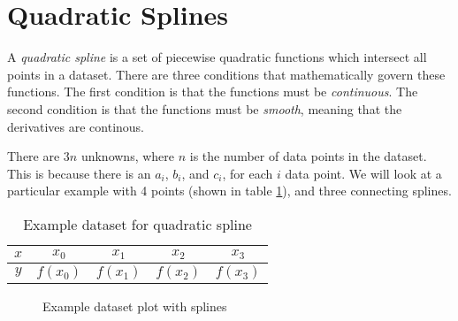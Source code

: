 \section{Quadratic Splines}

A \textit{quadratic spline} is a set of piecewise quadratic functions which intersect all points in a dataset. There are three conditions that mathematically govern these functions. The first condition is that the functions must be \textit{continuous}. The second condition is that the functions must be \textit{smooth}, meaning that the derivatives are continous.

There are $3n$ unknowns, where $n$ is the number of data points in the dataset. This is because there is an $a_i$, $b_i$, and $c_i$, for each $i$ data point. We will look at a particular example with 4 points (shown in table \ref{tab:dataset}), and three connecting splines.

\begin{table}[H]
\begin{center}
\caption{Example dataset for quadratic spline}
\label{tab:dataset}
  \begin{tabular}{|c|c|c|c|c|}
    \hline
    $x$ & $x_0$ & $x_1$ & $x_2$ & $x_3$\\ \hline
    $y$ & $f(x_0)$ & $f(x_1)$ & $f(x_2)$ & $f(x_3)$\\
    \hline
  \end{tabular}
\end{center}
\end{table}

\begin{figure}[H]
\begin{center}
\caption{Example dataset plot with splines}
\label{fig:spline}
\end{center}
\end{figure}

